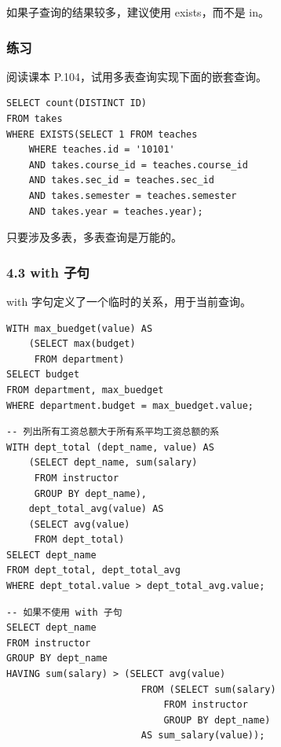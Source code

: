 \documentclass[aspectratio=169, 14pt]{beamer}
\begin{document}
{
\begin{frame}[standout]
	如果子查询的结果较多，建议使用 exists，而不是 in。
\end{frame}
}

\begin{frame}[fragile]
	\frametitle{练习}
	阅读课本 P.104，试用多表查询实现下面的嵌套查询。

	\begin{verbatim}
SELECT count(DISTINCT ID)
FROM takes
WHERE EXISTS(SELECT 1 FROM teaches
    WHERE teaches.id = '10101'
    AND takes.course_id = teaches.course_id
    AND takes.sec_id = teaches.sec_id
    AND takes.semester = teaches.semester
    AND takes.year = teaches.year);
    \end{verbatim}

\end{frame}

{
\begin{frame}[standout]
	只要涉及多表，多表查询是万能的。
\end{frame}
}

\begin{frame}[fragile]
	\frametitle{4.3 with 子句}

	\alert{with} 字句定义了一个临时的关系，用于当前查询。

	\begin{verbatim}
WITH max_buedget(value) AS
    (SELECT max(budget)
     FROM department)
SELECT budget
FROM department, max_buedget
WHERE department.budget = max_buedget.value;
\end{verbatim}
\end{frame}

\begin{frame}[fragile]

	\begin{verbatim}
-- 列出所有工资总额大于所有系平均工资总额的系
WITH dept_total (dept_name, value) AS
    (SELECT dept_name, sum(salary)
     FROM instructor
     GROUP BY dept_name),
    dept_total_avg(value) AS
    (SELECT avg(value)
     FROM dept_total)
SELECT dept_name
FROM dept_total, dept_total_avg
WHERE dept_total.value > dept_total_avg.value;
\end{verbatim}

\end{frame}

\begin{frame}[fragile]
	\begin{verbatim}
-- 如果不使用 with 子句
SELECT dept_name
FROM instructor
GROUP BY dept_name
HAVING sum(salary) > (SELECT avg(value)
                        FROM (SELECT sum(salary)
                            FROM instructor
                            GROUP BY dept_name)
                        AS sum_salary(value));
                        \end{verbatim}
\end{frame}
\end{document}
